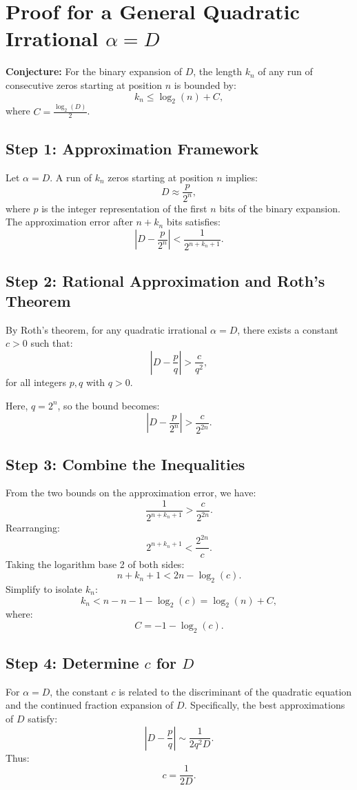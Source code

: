 \section{Proof for a General Quadratic Irrational \texorpdfstring{$\alpha = D$}{alpha = D}}

\textbf{Conjecture:} For the binary expansion of $D$, the length $k_n$ of any run of consecutive zeros starting at position $n$ is bounded by:
\[
k_n \leq \log_2(n) + C,
\]
where $C = \frac{\log_2(D)}{2}$.

\subsection*{Step 1: Approximation Framework}
Let $\alpha = D$. A run of $k_n$ zeros starting at position $n$ implies:
\[
D \approx \frac{p}{2^n},
\]
where $p$ is the integer representation of the first $n$ bits of the binary expansion. The approximation error after $n + k_n$ bits satisfies:
\[
\left| D - \frac{p}{2^n} \right| < \frac{1}{2^{n + k_n + 1}}.
\]

\subsection*{Step 2: Rational Approximation and Roth's Theorem}
By Roth's theorem, for any quadratic irrational $\alpha = D$, there exists a constant $c > 0$ such that:
\[
\left| D - \frac{p}{q} \right| > \frac{c}{q^2},
\]
for all integers $p, q$ with $q > 0$.

Here, $q = 2^n$, so the bound becomes:
\[
\left| D - \frac{p}{2^n} \right| > \frac{c}{2^{2n}}.
\]

\subsection*{Step 3: Combine the Inequalities}
From the two bounds on the approximation error, we have:
\[
\frac{1}{2^{n + k_n + 1}} > \frac{c}{2^{2n}}.
\]
Rearranging:
\[
2^{n + k_n + 1} < \frac{2^{2n}}{c}.
\]
Taking the logarithm base 2 of both sides:
\[
n + k_n + 1 < 2n - \log_2(c).
\]
Simplify to isolate $k_n$:
\[
k_n < n - n - 1 - \log_2(c) = \log_2(n) + C,
\]
where:
\[
C = -1 - \log_2(c).
\]

\subsection*{Step 4: Determine $c$ for $D$}
For $\alpha = D$, the constant $c$ is related to the discriminant of the quadratic equation and the continued fraction expansion of $D$. Specifically, the best approximations of $D$ satisfy:
\[
\left| D - \frac{p}{q} \right| \sim \frac{1}{2q^2D}.
\]
Thus:
\[
c = \frac{1}{2D}.
\]

